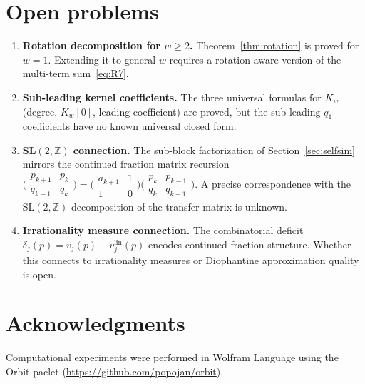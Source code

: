 \documentclass[11pt]{article}
\theoremstyle{definition}
\theoremstyle{remark}
\newcommand{\Z}{\mathbb{Z}}
\begin{document}
\section{Open problems}\label{sec:open}

\begin{enumerate}
\item \textbf{Rotation decomposition for $w \geq 2$.}
  Theorem~\ref{thm:rotation} is proved for $w = 1$.
  Extending it to general $w$ requires a rotation-aware version of
  the multi-term sum~\eqref{eq:R7}.

\item \textbf{Sub-leading kernel coefficients.}
  The three universal formulas for $K_w$ (degree, $K_w[0]$, leading
  coefficient) are proved, but the sub-leading $q_1$-coefficients
  have no known universal closed form.

\item \textbf{SL$(2, \mathbb{Z})$ connection.}
  The sub-block factorization of Section~\ref{sec:selfsim} mirrors
  the continued fraction matrix recursion
  $\bigl(\begin{smallmatrix} p_{k+1} & p_k \\ q_{k+1} & q_k
  \end{smallmatrix}\bigr) =
  \bigl(\begin{smallmatrix} a_{k+1} & 1 \\ 1 & 0
  \end{smallmatrix}\bigr)
  \bigl(\begin{smallmatrix} p_k & p_{k-1} \\ q_k & q_{k-1}
  \end{smallmatrix}\bigr)$.
  A precise correspondence with the SL$(2, \Z)$ decomposition of
  the transfer matrix is unknown.

\item \textbf{Irrationality measure connection.}
  The combinatorial deficit
  $\delta_j(p) = v_j(p) - v_j^{\mathrm{lin}}(p)$ encodes continued
  fraction structure.
  Whether this connects to irrationality measures or Diophantine
  approximation quality is open.
\end{enumerate}

\section*{Acknowledgments}

Computational experiments were performed in Wolfram Language using
the Orbit paclet
(\url{https://github.com/popojan/orbit}).



\end{document}
